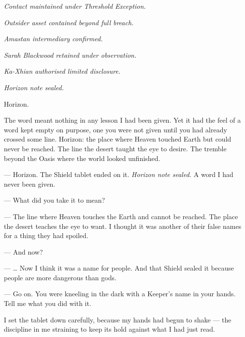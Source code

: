 \textit{Contact maintained under Threshold Exception.}\par

\textit{Outsider asset contained beyond full breach.}\par

\textit{Amastan intermediary confirmed.}\par

\textit{Sarah Blackwood retained under observation.}\par

\textit{Ka-Xhian authorised limited disclosure.}\par

\textit{Horizon note sealed.}\par

Horizon.\par

The word meant nothing in any lesson I had been given. Yet it had the feel of a word kept empty on purpose, one you were not given until you had already crossed some line. Horizon: the place where Heaven touched Earth but could never be reached. The line the desert taught the eye to desire. The tremble beyond the Oasis where the world looked unfinished.\par

\ornament

\begin{room}

--- Horizon. The Shield tablet ended on it. \emph{Horizon note sealed.} A word I had never been given.

--- What did you take it to mean?

--- The line where Heaven touches the Earth and cannot be reached. The place the desert teaches the eye to want. I thought it was another of their false names for a thing they had spoiled.

--- And now?

--- \ldots{} Now I think it was a name for people. And that Shield sealed it because people are more dangerous than gods.

--- Go on. You were kneeling in the dark with a Keeper's name in your hands. Tell me what you did with it.

\end{room}

\ornament


I set the tablet down carefully, because my hands had begun to shake --- the discipline in me straining to keep its hold against what I had just read.\par

